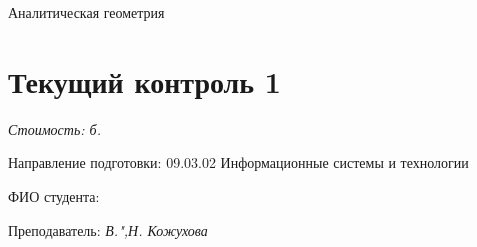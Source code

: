 \documentclass[a4paper, 12pt]{article}
\begin{document}
\thispagestyle{empty}
\vspace{-10ex}

\begin{center}
	\Huge{Аналитическая геометрия}\\
	\vspace{-3ex}
	\section*{Текущий контроль 1}
\end{center}
\vspace{-2ex}	
\textit{Стоимость: \pointssum* б.}
\begin{flushleft}
	Направление подготовки: 09.03.02 Информационные системы и технологии %
	
	ФИО студента: %
	
	
	Преподаватель: \textit{В.",Н. Кожухова}	
\end{flushleft}	
\end{document}
